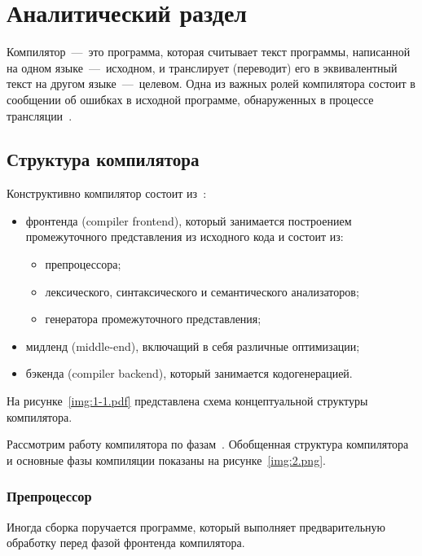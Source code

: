 \section{Аналитический раздел}

Компилятор~---~это программа, которая считывает текст программы, написанной на одном языке~---~исходном, и транслирует (переводит) его в эквивалентный текст на другом языке~---~целевом. Одна из важных ролей компилятора состоит в сообщении об ошибках в исходной программе, обнаруженных в процессе трансляции~\cite{aho2003}.

\subsection{Структура компилятора}

Конструктивно компилятор состоит из~\cite{vladimirtov2004struct,grune2012modern}:
\begin{itemize}
    \item фронтенда (compiler frontend), который занимается построением промежуточного представления из исходного кода и состоит из:
    \begin{itemize}
        \item препроцессора; 
        \item лексического, синтаксического и семантического анализаторов;
        \item генератора промежуточного представления;
    \end{itemize}
    \item мидленд (middle-end), включащий в себя различные оптимизации;
    \item бэкенда (compiler backend), который занимается кодогенерацией.
\end{itemize}

На рисунке~\ref{img:1-1.pdf} представлена схема концептуальной структуры компилятора.

Рассмотрим работу компилятора по фазам~\cite{serebrykov2001}. Обобщенная структура компилятора и основные фазы компиляции показаны на рисунке~\ref{img:2.png}.


\subsubsection*{Препроцессор}

Иногда сборка поручается программе, который выполняет предварительную обработку перед фазой фронтенда компилятора. 

